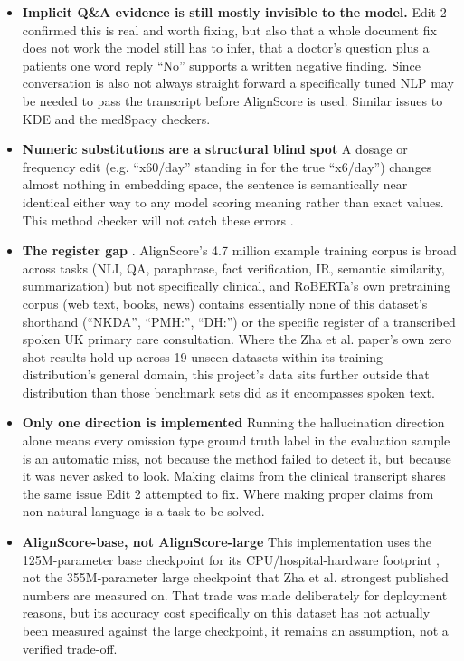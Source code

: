 \documentclass[11pt,a4paper]{article}
\begin{document}
\begin{itemize}
    \item \textbf{Implicit Q\&A evidence is still mostly invisible to the model.} Edit 2 confirmed this is real and worth fixing, but also that a whole document fix does not work the model still has to infer, that a doctor’s question plus a patients one word reply “No” supports a written negative finding. Since conversation is also not always straight forward a specifically tuned NLP may be needed to pass the transcript before AlignScore is used. Similar issues to KDE and the medSpacy checkers.
    \item  \textbf{Numeric substitutions are a structural blind spot} A dosage or frequency edit (e.g. “x60/day” standing in for the true “x6/day”) changes almost nothing in embedding space, the sentence is semantically near identical either way to any model scoring meaning rather than exact values. This method checker will not catch these errors \cite{zha2023alignscore} .
    \item \textbf{The register gap }. AlignScore’s 4.7 million example training corpus is broad across tasks (NLI, QA, paraphrase, fact verification, IR, semantic similarity, summarization) but not specifically clinical, and RoBERTa’s own pretraining corpus (web text, books, news) contains essentially none of this dataset’s shorthand (“NKDA”, “PMH:”, “DH:”) or the specific register of a transcribed spoken UK primary care consultation. Where the Zha et al. paper's \cite{zha2023alignscore} own zero shot results hold up across 19 unseen datasets within its training distribution’s general domain, this project’s data sits further outside that distribution than those benchmark sets did as it encompasses spoken text.
    \item \textbf{Only one direction is implemented}  Running the hallucination direction alone means every omission type ground truth label in the evaluation sample is an automatic miss, not because the method failed to detect it, but because it was never asked to look. Making claims from the clinical transcript shares the same issue Edit 2 attempted to fix. Where making proper claims from non natural language is a task to be solved.
    \item \textbf{AlignScore-base, not AlignScore-large}  This implementation uses the 125M-parameter base checkpoint for its CPU/hospital-hardware footprint , not the 355M-parameter large checkpoint that Zha et al. \cite{zha2023alignscore} strongest published numbers are measured on. That trade was made deliberately for deployment reasons, but its accuracy cost specifically on this dataset has not actually been measured against the large checkpoint, it remains an assumption, not a verified trade-off.
\end{itemize}
\end{document}
